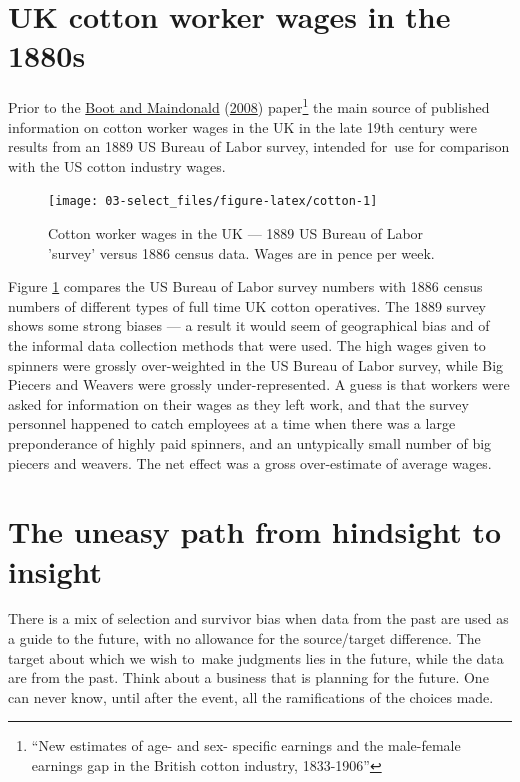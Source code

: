 \documentclass[
  10pt,
  b5paper]{book}
\begin{document}
\hypertarget{uk-cotton-worker-wages-in-the-1880s}{%
\section{UK cotton worker wages in the 1880s}\label{uk-cotton-worker-wages-in-the-1880s}}

Prior to the \protect\hyperlink{ref-boot2008new}{Boot and Maindonald} (\protect\hyperlink{ref-boot2008new}{2008}) paper\footnote{``New estimates of age- and sex- specific
  earnings and the male-female earnings gap in the British cotton
  industry, 1833-1906''} the main source of published information on
cotton worker wages in the UK in the late 19th century were results
from an 1889 US Bureau of Labor survey, intended for~use for
comparison with the US cotton industry wages.

\begin{figure}

{\centering \texttt{[image: 03-select\_files/figure-latex/cotton-1]} 

}

\caption{Cotton worker wages in the UK --- 1889 US Bureau of Labor 'survey'
versus 1886 census data. Wages are in pence per week.}\label{fig:cotton}
\end{figure}

Figure \ref{fig:cotton} compares the US Bureau of Labor
survey numbers with 1886 census numbers of different types
of full time UK cotton operatives.
The 1889 survey shows some strong biases --- a result it
would seem of geographical bias and of the informal data
collection methods that were used. The high wages given to
spinners were grossly over-weighted in the US Bureau of
Labor survey, while Big Piecers and Weavers were grossly
under-represented. A guess is that workers were asked for
information on their wages as they left work, and that
the survey personnel happened to catch employees at a time
when there was a large preponderance of highly paid spinners,
and an untypically small number of big piecers and weavers.
The net effect was a gross over-estimate of average wages.

\hypertarget{the-uneasy-path-from-hindsight-to-insight}{%
\section{The uneasy path from hindsight to insight}\label{the-uneasy-path-from-hindsight-to-insight}}

There is a mix of selection and survivor bias when data
from the past are used as a guide to the future, with no
allowance for the source/target difference. The target about
which we wish to~make judgments lies in the future, while the
data are from the past. Think about a business that is
planning for the future. One can never know, until after the
event, all the ramifications of the choices made.
\end{document}
